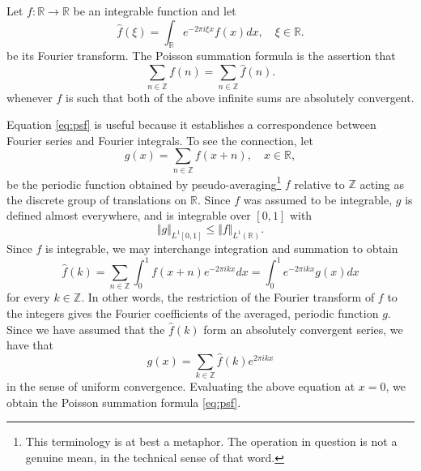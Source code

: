 \documentclass[12pt]{article}
\newcommand{\Rset}{\mathbb{R}}
\newcommand{\Zset}{\mathbb{Z}}
\newcommand{\hf}{\hat{f}}
\newcommand{\rLo}{L^{\!1}}
\begin{document}
Let $f:\Rset\to\Rset$ be an integrable function and let   
\[\hf(\xi)= \int_{\Rset} e^{-2\pi i\xi x} f(x)dx,\quad \xi\in\Rset.\] 
be its Fourier transform.   The Poisson summation formula is the assertion that
\begin{equation}
  \label{eq:psf}
  \sum_{n\in\Zset} f(n) = \sum_{n\in\Zset} \hf(n).
\end{equation}
whenever $f$ is such that both of the above infinite sums are
absolutely convergent.

Equation \eqref{eq:psf} is useful because it establishes a
correspondence between Fourier series and Fourier integrals.  To see
the connection, let
\[ g(x)=\sum_{n\in\Zset} f(x+n),\quad x\in\Rset, \] be the periodic
function obtained by pseudo-averaging\footnote{This terminology is at best a metaphor.  The operation in question is not a genuine mean, in the technical sense of that word.} $f$ relative to $\Zset$ acting
as the discrete group of translations on $\Rset$.  Since $f$ was
assumed to be integrable, $g$ is defined almost everywhere, and is
integrable over $[0,1]$ with
\[ \Vert g \Vert_{\rLo[0,1]}\leq \Vert f\Vert_{\rLo(\Rset)}.\]
Since $f$ is integrable, we may interchange integration and summation
to obtain
\[\hf(k) = \sum_{n\in\Zset} \int_0^1 f(x+n)e^{-2\pi ik x} dx =
\int_0^1 e^{-2\pi i k x} g(x) dx
\] 
for every $k\in\Zset$.  In other words, the restriction of the Fourier
transform of $f$ to the integers gives the Fourier coefficients of the
averaged, periodic function $g$.  Since we have assumed that the
$\hf(k)$ form an absolutely convergent series, we have that
\[ g(x) = \sum_{k\in\Zset} \hf(k) e^{2\pi ik x}\] in the sense of
uniform convergence.  Evaluating the above equation at $x=0$, we
obtain the Poisson summation formula \eqref{eq:psf}.
\end{document}
